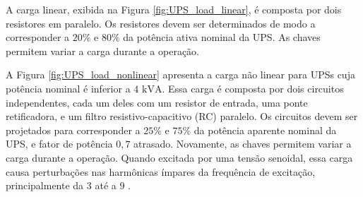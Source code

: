\documentclass[repeatfields,oneside]{tcc}
\begin{document}
A carga linear, exibida na Figura \ref{fig:UPS_load_linear}, é composta por dois resistores em paralelo.
Os resistores devem ser determinados de modo a corresponder a $20 \%$ e $80 \%$ da potência ativa nominal da UPS.
As chaves permitem variar a carga durante a operação.


A Figura \ref{fig:UPS_load_nonlinear} apresenta a carga não linear para UPSs cuja potência nominal é inferior a $4 \text{ kVA}$.
Essa carga é composta por dois circuitos independentes, cada um deles com um resistor de entrada, uma ponte retificadora, e um filtro resistivo-capacitivo (RC) paralelo.
Os circuitos devem ser projetados para corresponder a $25 \%$ e $75 \%$ da potência aparente nominal da UPS, e fator de potência $0,7$ atrasado.
Novamente, as chaves permitem variar a carga durante a operação.
Quando excitada por uma tensão senoidal, essa carga causa perturbações nas harmônicas ímpares da frequência de excitação, principalmente da 3{\textordfeminine} até a 9{\textordfeminine} \cite{Pereira2014, Bertoldi2019}.

\end{document}
